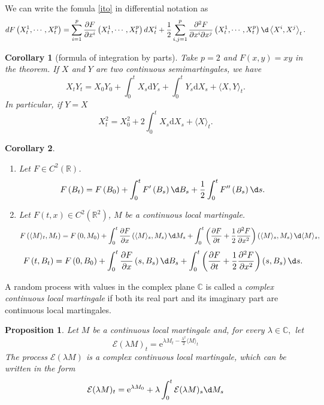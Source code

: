 \documentclass{report}
\newtheorem{proposition}{Proposition}[section]
\newtheorem{corollary}{Corollary}[section]
\theoremstyle{nonumberplain}
\begin{document}
We can write the fomula \ref{ito} in differential notation as
\[
dF\left(X_{t}^{1}, \cdots, X_{t}^{p}\right)=\sum_{i=1}^{p}  \frac{\partial F}{\partial x^{i}}\left(X_{t}^{1}, \cdots, X_{t}^{p}\right) d X_{t}^{i} 
+\frac{1}{2} \sum_{i, j=1}^{p}  \frac{\partial^{2} F}{\partial x^{i} \partial x^{j}}\left(X_{t}^{1}, \cdots, X_{t}^{p}\right) \d\left\langle X^{i}, X^{j}\right\rangle_{t}.
\]

\begin{corollary}[formula of integration by parts]
	Take $p=2$ and $F(x, y)=x y$ in the theorem. If $X$ and $Y$ are two continuous semimartingales, we have
	\[
	X_{t} Y_{t}=X_{0} Y_{0}+\int_{0}^{t} X_{s} \mathrm{d} Y_{s}+\int_{0}^{t} Y_{s} \mathrm{d} X_{s}+\langle X, Y\rangle_{t}.
	\]
	In particular, if $Y=X$
	\[
	X_{t}^{2}=X_{0}^{2}+2 \int_{0}^{t} X_{s} \mathrm{d} X_{s}+\langle X\rangle_{t}.
	\]
\end{corollary}

\begin{corollary}
	\begin{enumerate}
		\item Let $F\in C^2(\mathbb{R})$.
		$$F\left(B_{t}\right)=F\left(B_{0}\right)+\int_{0}^{t} F^{\prime}\left(B_{s}\right) \d B_{s}+\frac{1}{2} \int_{0}^{t} F^{\prime \prime}\left(B_{s}\right) \d s.$$
		\item Let $F(t,x)\in C^2(\mathbb{R}^2)$, $M$ be a continuous local martingale.
		\[
		F\left(\langle M\rangle_{t}, M_{t}\right)=F\left(0, M_{0}\right)+\int_{0}^{t} \frac{\partial F}{\partial x}\left(\langle M\rangle_{s}, M_{s}\right) \d M_{s}+\int_{0}^{t}\left(\frac{\partial F}{\partial t}+\frac{1}{2} \frac{\partial^{2} F}{\partial x^{2}}\right)\left(\langle M\rangle_{s}, M_{s}\right) \d \langle M\rangle_{s},
		\]
		\[
		F\left(t, B_{t}\right)=F\left(0, B_{0}\right)+\int_{0}^{t} \frac{\partial F}{\partial x}\left(s, B_{s}\right) \d B_{s}+\int_{0}^{t}\left(\frac{\partial F}{\partial t}+\frac{1}{2} \frac{\partial^{2} F}{\partial x^{2}}\right)\left(s, B_{s}\right) \d s.
		\]
	\end{enumerate}	
\end{corollary}

A random process with values in the complex plane $\mathbb{C}$ is called a \emph{complex continuous local martingale} if both its real part and its imaginary part are continuous local martingales.

\begin{proposition}
	Let $M$ be a continuous local martingale and, for every $\lambda \in \mathbb{C},$ let
	\[
	\mathcal{E}(\lambda M)_{t}=\mathrm{e}^{\lambda M_{t}-\tfrac{\lambda^{2}}{2}\langle M\rangle_{t}}
	\]
	The process $\mathcal{E}(\lambda M)$ is a complex continuous local martingale, which can be written
	in the form
	\[
	\mathcal{E}(\lambda M)_{t}=\mathrm{e}^{\lambda M_{0}}+\lambda \int_{0}^{t} \mathcal{E}(\lambda M)_{s} \d M_{s}
	\]
\end{proposition}
\end{document}

